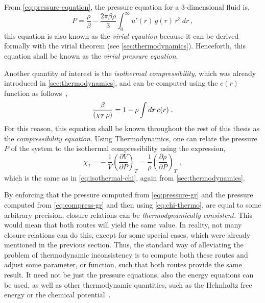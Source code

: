 From \autoref{eq:pressure-equation}, the pressure equation for a $3$-dimensional fluid is,
\begin{equation}
    P = \frac{\rho}{\beta} - \frac{2 \pi \beta \rho}{3} \int_{0}^{\infty} u'(r) \, g(r) \, r^3 \, dr \, ,
    \label{eq:pressure-gr}
\end{equation}
this equation is also known as the \emph{virial equation} because it can be derived 
formally with the virial theorem (see \autoref{sec:thermodynamics}). Henceforth, 
this equation shall be known as the \emph{virial pressure equation}.

Another quantity of interest is the \emph{isothermal compressibility}, which was already 
introduced in \autoref{sec:thermodynamics}, and can be computed using the \(c(r)\) function 
as follows~\cite{hansenTheorySimpleLiquids2013},
\begin{equation}
    \frac{\beta}{\left( \chi_{T} \,  \rho \right)} = 1 - \rho \int d \bm{r} \, c(r)
    \; .
    \label{eq:compress-gr}
\end{equation}
For this reason, this equation shall be known throughout the rest of this thesis as the 
\emph{compressibility equation}. Using Thermodynamics, one can relate the pressure \(P\) of the system to the isothermal compressibility using the expression,
\begin{equation}
    \chi_{T} = - \, \frac{1}{V} { \left( \frac{\partial V}{\partial P} \right) }_{T} =
    \frac{1}{\rho} { \left( \frac{\partial \rho}{\partial P} \right) }_{T}
    \; ,
    \label{eq:chi-thermo}
\end{equation}
which is the same as in \autoref{eq:isothermal-chi}, again from 
\autoref{sec:thermodynamics}.

By enforcing that the pressure computed from \autoref{eq:pressure-gr} and the pressure 
computed from \autoref{eq:compress-gr} and then using \autoref{eq:chi-thermo}, are equal to 
some arbitrary precision, closure relations can be \emph{thermodynamically consistent}. 
This would mean that both routes will yield the same value. In reality, not many closure 
relations can do this, except for some special cases, which were already mentioned in the 
previous section. Thus, the standard way of alleviating the problem of thermodynamic 
inconsistency is to compute both these routes and adjust some parameter, or function, 
such that both routes provide the same result. It need not be just the pressure equations, 
also the energy equations can be used, as well as other thermodynamic quantities, such as 
the Helmholtz free energy or the chemical 
potential~\cite{tsedneeClosureOrnsteinZernikeEquation2019}.

